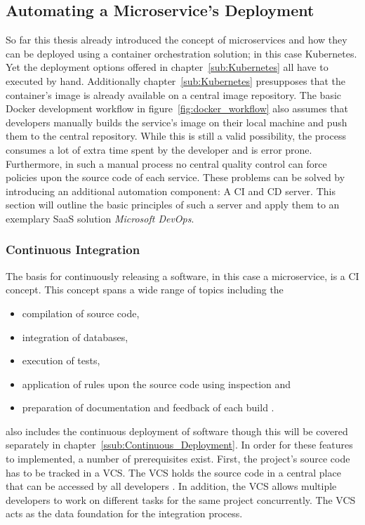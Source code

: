
\subsection{Automating a Microservice's Deployment}%
\label{sub:Automatic_a_Microservices_Deployment}
So far this thesis already introduced the concept of microservices and how they
can be deployed using a container orchestration solution; in this case
Kubernetes. Yet the deployment options offered in chapter~\ref{sub:Kubernetes}
all have to executed by hand. Additionally chapter~\ref{sub:Kubernetes}
presupposes that the container's image is already available on a central image
repository. The basic Docker development workflow in
figure~\ref{fig:docker_workflow} also assumes that developers manually builds
the service's image on their local machine and push them to the central
repository. While this is still a valid possibility, the process consumes a lot
of extra time spent by the developer and is error prone. Furthermore, in such a
manual process no central quality control can force policies upon the source
code of each service. These problems can be solved by introducing an additional
automation component: A \ac{CI} and \ac{CD} server. This section will outline
the basic principles of such a server and apply them to an exemplary \ac{SaaS}
solution \textit{Microsoft DevOps}.

\subsubsection{Continuous Integration}%
\label{ssub:Continuous_Integration}
The basis for continuously releasing a software, in this case a microservice,
is a \ac{CI} concept. This concept spans a wide range of topics including the
\begin{itemize}
  \item compilation of source code,
  \item integration of databases,
  \item execution of tests,
  \item application of rules upon the source code using inspection and
  \item preparation of documentation and feedback of each build \autocite[pp.
    12-20]{MatyasContinuousIntegration2007}.
\end{itemize}

\autocite{MatyasContinuousIntegration2007} also includes the continuous
deployment of software though this will be covered separately in
chapter~\ref{ssub:Continuous_Deployment}. In order for these features to
implemented, a number of prerequisites exist. First, the project's source code
has to be tracked in a \ac{VCS}. The \ac{VCS} holds the source code in a
central place that can be accessed by all developers \autocite[Ch.
1]{MatyasContinuousIntegration2007}. In addition, the \ac{VCS} allows multiple
developers to work on different tasks for the same project concurrently. The
\ac{VCS} acts as the data foundation for the integration process.

